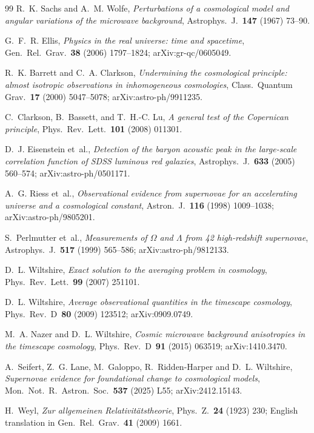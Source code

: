 \documentclass[11pt,a4paper]{article}
\begin{document}
\begin{thebibliography}{99}
R.~K. Sachs and A.~M. Wolfe,
\emph{Perturbations of a cosmological model and angular variations of the microwave background},
Astrophys.~J.~\textbf{147} (1967) 73--90.

G.~F.~R. Ellis,
\emph{Physics in the real universe: time and spacetime},
Gen.~Rel.~Grav.~\textbf{38} (2006) 1797--1824; arXiv:gr-qc/0605049.

R.~K. Barrett and C.~A. Clarkson,
\emph{Undermining the cosmological principle: almost isotropic observations in inhomogeneous cosmologies},
Class.~Quantum Grav.~\textbf{17} (2000) 5047--5078; arXiv:astro-ph/9911235.

C.~Clarkson, B.~Bassett, and T.~H.-C. Lu,
\emph{A general test of the Copernican principle},
Phys.~Rev.~Lett.~\textbf{101} (2008) 011301.

D.~J. Eisenstein et~al.,
\emph{Detection of the baryon acoustic peak in the large-scale correlation function of SDSS luminous red galaxies},
Astrophys.~J.~\textbf{633} (2005) 560--574; arXiv:astro-ph/0501171.

A.~G. Riess et~al.,
\emph{Observational evidence from supernovae for an accelerating universe and a cosmological constant},
Astron.~J.~\textbf{116} (1998) 1009--1038; arXiv:astro-ph/9805201.

S.~Perlmutter et~al.,
\emph{Measurements of $\Omega$ and $\Lambda$ from 42 high-redshift supernovae},
Astrophys.~J.~\textbf{517} (1999) 565--586; arXiv:astro-ph/9812133.

D.~L. Wiltshire,
\emph{Exact solution to the averaging problem in cosmology},
Phys.~Rev.~Lett.~\textbf{99} (2007) 251101.

D.~L. Wiltshire,
\emph{Average observational quantities in the timescape cosmology},
Phys.~Rev.~D~\textbf{80} (2009) 123512; arXiv:0909.0749.

M.~A. Nazer and D.~L. Wiltshire,
\emph{Cosmic microwave background anisotropies in the timescape cosmology},
Phys.~Rev.~D~\textbf{91} (2015) 063519; arXiv:1410.3470.

A.~Seifert, Z.~G. Lane, M.~Galoppo, R.~Ridden-Harper and D.~L. Wiltshire,
\emph{Supernovae evidence for foundational change to cosmological models},
Mon.~Not.~R.~Astron.~Soc.~\textbf{537} (2025) L55; arXiv:2412.15143.

H.~Weyl,
\emph{Zur allgemeinen Relativit\"atstheorie},
Phys.~Z.~\textbf{24} (1923) 230; English translation in Gen.~Rel.~Grav.~\textbf{41} (2009) 1661.


\end{thebibliography}
\end{document}
